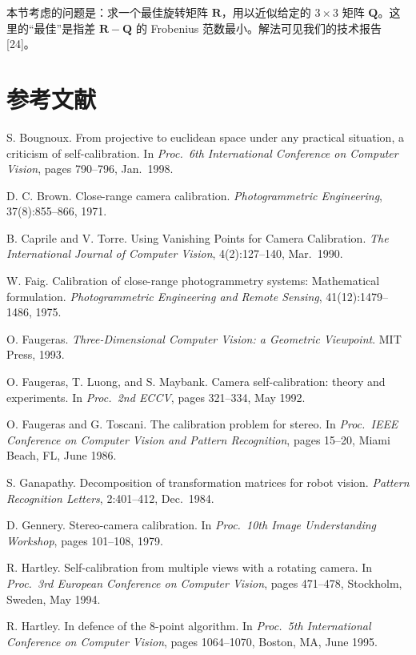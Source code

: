 \documentclass[a4paper,twocolumn,zihao=5,fontset=none,UTF8]{ctexart}
\newcommand{\R}{\mathbf{R}}
\begin{document}
本节考虑的问题是：求一个最佳旋转矩阵 $\R$，用以近似给定的 $3\times3$ 矩阵 $\mathbf{Q}$。这里的“最佳”是指差 $\R-\mathbf{Q}$ 的 Frobenius 范数最小。解法可见我们的技术报告[24]。

\section*{参考文献}
\begingroup
\small
\renewcommand{\refname}{}
\begin{enumerate}[label={[\arabic*]},leftmargin=2.2em,itemsep=1pt]
\item S. Bougnoux. From projective to euclidean space under any practical situation, a criticism of self-calibration. In \emph{Proc.\ 6th International Conference on Computer Vision}, pages 790--796, Jan.\ 1998.
\item D. C. Brown. Close-range camera calibration. \emph{Photogrammetric Engineering}, 37(8):855--866, 1971.
\item B. Caprile and V. Torre. Using Vanishing Points for Camera Calibration. \emph{The International Journal of Computer Vision}, 4(2):127--140, Mar.\ 1990.
\item W. Faig. Calibration of close-range photogrammetry systems: Mathematical formulation. \emph{Photogrammetric Engineering and Remote Sensing}, 41(12):1479--1486, 1975.
\item O. Faugeras. \emph{Three-Dimensional Computer Vision: a Geometric Viewpoint}. MIT Press, 1993.
\item O. Faugeras, T. Luong, and S. Maybank. Camera self-calibration: theory and experiments. In \emph{Proc.\ 2nd ECCV}, pages 321--334, May 1992.
\item O. Faugeras and G. Toscani. The calibration problem for stereo. In \emph{Proc.\ IEEE Conference on Computer Vision and Pattern Recognition}, pages 15--20, Miami Beach, FL, June 1986.
\item S. Ganapathy. Decomposition of transformation matrices for robot vision. \emph{Pattern Recognition Letters}, 2:401--412, Dec.\ 1984.
\item D. Gennery. Stereo-camera calibration. In \emph{Proc.\ 10th Image Understanding Workshop}, pages 101--108, 1979.
\item R. Hartley. Self-calibration from multiple views with a rotating camera. In \emph{Proc.\ 3rd European Conference on Computer Vision}, pages 471--478, Stockholm, Sweden, May 1994.
\item R. Hartley. In defence of the 8-point algorithm. In \emph{Proc.\ 5th International Conference on Computer Vision}, pages 1064--1070, Boston, MA, June 1995.

\end{enumerate}
\end{document}
